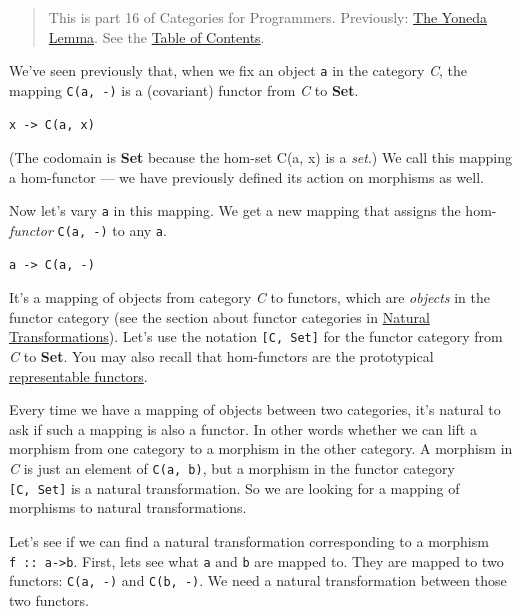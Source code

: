 \begin{quote}
This is part 16 of Categories for Programmers. Previously:
\href{https://bartoszmilewski.com/2015/09/01/the-yoneda-lemma/}{The
Yoneda Lemma}. See the
\href{https://bartoszmilewski.com/2014/10/28/category-theory-for-programmers-the-preface/}{Table
of Contents}.
\end{quote}

We've seen previously that, when we fix an object \texttt{a} in the
category \emph{C}, the mapping \texttt{C(a,\ -)} is a (covariant)
functor from \emph{C} to \textbf{Set}.

\begin{verbatim}
x -> C(a, x)
\end{verbatim}

(The codomain is \textbf{Set} because the hom-set C(a, x) is a
\emph{set}.) We call this mapping a hom-functor --- we have previously
defined its action on morphisms as well.

Now let's vary \texttt{a} in this mapping. We get a new mapping that
assigns the hom-\emph{functor} \texttt{C(a,\ -)} to any \texttt{a}.

\begin{verbatim}
a -> C(a, -)
\end{verbatim}

It's a mapping of objects from category \emph{C} to functors, which are
\emph{objects} in the functor category (see the section about functor
categories in
\href{https://bartoszmilewski.com/2015/04/07/natural-transformations/}{Natural
Transformations}). Let's use the notation \texttt{{[}C,\ Set{]}} for the
functor category from \emph{C} to \textbf{Set}. You may also recall that
hom-functors are the prototypical
\href{https://bartoszmilewski.com/2015/07/29/representable-functors/}{representable
functors}.

Every time we have a mapping of objects between two categories, it's
natural to ask if such a mapping is also a functor. In other words
whether we can lift a morphism from one category to a morphism in the
other category. A morphism in \emph{C} is just an element of
\texttt{C(a,\ b)}, but a morphism in the functor category
\texttt{{[}C,\ Set{]}} is a natural transformation. So we are looking
for a mapping of morphisms to natural transformations.

Let's see if we can find a natural transformation corresponding to a
morphism \texttt{f\ ::\ a-\textgreater{}b}. First, lets see what
\texttt{a} and \texttt{b} are mapped to. They are mapped to two
functors: \texttt{C(a,\ -)} and \texttt{C(b,\ -)}. We need a natural
transformation between those two functors.

